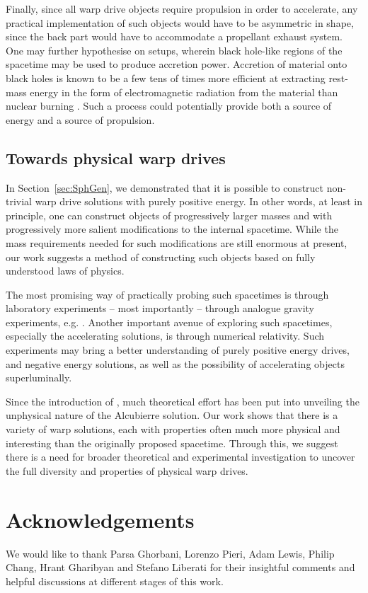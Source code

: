 \documentclass[10pt]{iopart}
\begin{document}
Finally, since all warp drive objects require propulsion in order to accelerate, any practical implementation of such objects would have to be asymmetric in shape, since the back part would have to accommodate a propellant exhaust system. One may further hypothesise on setups, wherein black hole-like regions of the spacetime may be used to produce accretion power. Accretion of material onto black holes is known to be a few tens of times more efficient at extracting rest-mass energy in the form of electromagnetic radiation from the material than nuclear burning \cite{Frank2002}. Such a process could potentially provide both a source of energy and a source of propulsion.



\subsection{Towards physical warp drives}

In Section~\ref{sec:SphGen}, we demonstrated that it is possible to construct non-trivial warp drive solutions with purely positive energy. In other words, at least in principle, one can construct objects of progressively larger masses and with progressively more salient modifications to the internal spacetime. While the mass requirements needed for such modifications are still enormous at present, our work suggests a method of constructing such objects based on fully understood laws of physics.

The most promising way of practically probing such spacetimes is through laboratory experiments -- most importantly -- through analogue gravity experiments, e.g. \cite{Barcelo2005}. Another important avenue of exploring such spacetimes, especially the accelerating solutions, is through numerical relativity. Such experiments may bring a better understanding of purely positive energy drives, and negative energy solutions, as well as the possibility of accelerating objects superluminally.

Since the introduction of \cite{Alcubierre1994}, much theoretical effort has been put into unveiling the unphysical nature of the Alcubierre solution. Our work shows that there is a variety of warp solutions, each with properties often much more physical and interesting than the originally proposed spacetime. Through this, we suggest there is a need for broader theoretical and experimental investigation to uncover the full diversity and properties of physical warp drives.


\section*{Acknowledgements}
We would like to thank Parsa Ghorbani, Lorenzo Pieri, Adam Lewis, Philip Chang, Hrant Gharibyan and Stefano Liberati for their insightful comments and helpful discussions at different stages of this work.
\end{document}
